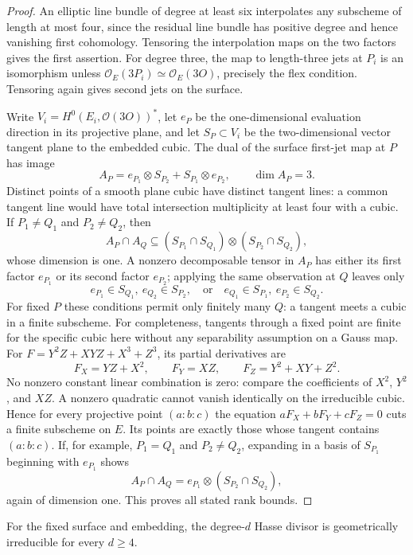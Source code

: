 \begin{proof}
An elliptic line bundle of degree at least six interpolates
any subscheme of length at most four, since the residual line
bundle has positive degree and hence vanishing first cohomology.
Tensoring the interpolation maps on the two factors gives the
first assertion. For degree three, the map to length-three
jets at $P_i$ is an isomorphism unless
$\mathcal O_E(3P_i)\simeq\mathcal O_E(3O)$, precisely the flex
condition. Tensoring again gives second jets on the surface.

Write $V_i=H^0(E_i,\mathcal O(3O))^*$, let $e_P$ be the
one-dimensional evaluation direction in its projective plane,
and let $S_P\subset V_i$ be the two-dimensional vector tangent
plane to the embedded cubic. The dual of the surface first-jet
map at $P$ has image
\[
 A_P=e_{P_1}\otimes S_{P_2}+S_{P_1}\otimes e_{P_2},
 \qquad\dim A_P=3.
\]
Distinct points of a smooth plane cubic have distinct tangent
lines: a common tangent line would have total intersection
multiplicity at least four with a cubic.
If $P_1\ne Q_1$ and $P_2\ne Q_2$, then
\[
 A_P\cap A_Q\subseteq
 (S_{P_1}\cap S_{Q_1})\otimes(S_{P_2}\cap S_{Q_2}),
\]
whose dimension is one. A nonzero decomposable tensor in $A_P$
has either its first factor $e_{P_1}$ or its second factor
$e_{P_2}$; applying the same observation at $Q$ leaves only
\[
 e_{P_1}\in S_{Q_1},\ e_{Q_2}\in S_{P_2},
 \quad\text{or}\quad
 e_{Q_1}\in S_{P_1},\ e_{P_2}\in S_{Q_2}.
\]
For fixed $P$ these conditions permit only finitely many $Q$:
a tangent meets a cubic in a finite subscheme. For completeness,
tangents through a fixed point are finite for the specific
cubic here without any separability assumption on a Gauss map.
For $F=Y^2Z+XYZ+X^3+Z^3$, its partial derivatives are
\[
 F_X=YZ+X^2,\qquad F_Y=XZ,\qquad F_Z=Y^2+XY+Z^2.
\]
No nonzero constant linear combination is zero: compare the
coefficients of $X^2$, $Y^2$, and $XZ$. A nonzero quadratic
cannot vanish identically on the irreducible cubic. Hence for
every projective point $(a:b:c)$ the equation
$aF_X+bF_Y+cF_Z=0$ cuts a finite subscheme on $E$. Its points
are exactly those whose tangent contains $(a:b:c)$.
If, for example, $P_1=Q_1$ and $P_2\ne Q_2$, expanding in a
basis of $S_{P_1}$ beginning with $e_{P_1}$ shows
\[
 A_P\cap A_Q=e_{P_1}\otimes(S_{P_2}\cap S_{Q_2}),
\]
again of dimension one. This proves all stated rank bounds.
\end{proof}

\begin{theorem}
\label{thm:product-Hasse-irred}
For the fixed surface and embedding, the degree-$d$ Hasse divisor
is geometrically irreducible for every $d\ge4$.
\end{theorem}

